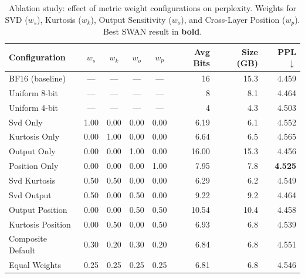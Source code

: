 \begin{table}[t]
\centering
\caption{Ablation study: effect of metric weight configurations on perplexity. Weights for SVD ($w_s$), Kurtosis ($w_k$), Output Sensitivity ($w_o$), and Cross-Layer Position ($w_p$). Best SWAN result in \textbf{bold}.}
\label{tab:ablation}
\begin{tabular}{lccccrrr}
\toprule
Configuration & $w_s$ & $w_k$ & $w_o$ & $w_p$ & Avg Bits & Size (GB) & PPL $\downarrow$ \\
\midrule
  BF16 (baseline) & --- & --- & --- & --- & 16 & 15.3 & 4.459 \\
  Uniform 8-bit & --- & --- & --- & --- & 8 & 8.1 & 4.464 \\
  Uniform 4-bit & --- & --- & --- & --- & 4 & 4.3 & 4.503 \\
\midrule
  Svd Only & 1.00 & 0.00 & 0.00 & 0.00 & 6.19 & 6.1 & 4.552 \\
  Kurtosis Only & 0.00 & 1.00 & 0.00 & 0.00 & 6.64 & 6.5 & 4.565 \\
  Output Only & 0.00 & 0.00 & 1.00 & 0.00 & 16.00 & 15.3 & 4.456 \\
  Position Only & 0.00 & 0.00 & 0.00 & 1.00 & 7.95 & 7.8 & \textbf{4.525} \\
  Svd Kurtosis & 0.50 & 0.50 & 0.00 & 0.00 & 6.29 & 6.2 & 4.549 \\
  Svd Output & 0.50 & 0.00 & 0.50 & 0.00 & 9.22 & 9.2 & 4.464 \\
  Output Position & 0.00 & 0.00 & 0.50 & 0.50 & 10.54 & 10.4 & 4.458 \\
  Kurtosis Position & 0.00 & 0.50 & 0.00 & 0.50 & 6.93 & 6.8 & 4.539 \\
  Composite Default & 0.30 & 0.20 & 0.30 & 0.20 & 6.84 & 6.8 & 4.551 \\
  Equal Weights & 0.25 & 0.25 & 0.25 & 0.25 & 6.81 & 6.8 & 4.546 \\
\bottomrule
\end{tabular}
\end{table}